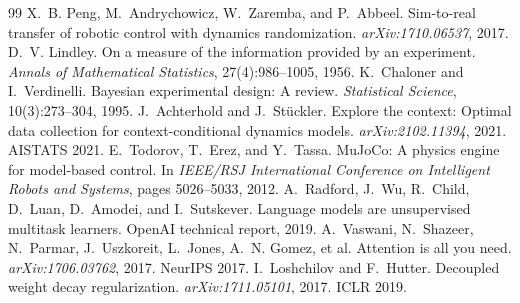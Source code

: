 \documentclass{article}
\begin{document}
\begin{thebibliography}{99}
 X.~B. Peng, M.~Andrychowicz, W.~Zaremba, and P.~Abbeel. Sim-to-real transfer of robotic control with dynamics randomization. \emph{arXiv:1710.06537}, 2017.
 D.~V. Lindley. On a measure of the information provided by an experiment. \emph{Annals of Mathematical Statistics}, 27(4):986--1005, 1956.
 K.~Chaloner and I.~Verdinelli. Bayesian experimental design: A review. \emph{Statistical Science}, 10(3):273--304, 1995.
 J.~Achterhold and J.~St\"uckler. Explore the context: Optimal data collection for context-conditional dynamics models. \emph{arXiv:2102.11394}, 2021. AISTATS 2021.
 E.~Todorov, T.~Erez, and Y.~Tassa. MuJoCo: A physics engine for model-based control. In \emph{IEEE/RSJ International Conference on Intelligent Robots and Systems}, pages 5026--5033, 2012.
 A.~Radford, J.~Wu, R.~Child, D.~Luan, D.~Amodei, and I.~Sutskever. Language models are unsupervised multitask learners. OpenAI technical report, 2019.
 A.~Vaswani, N.~Shazeer, N.~Parmar, J.~Uszkoreit, L.~Jones, A.~N. Gomez, et al. Attention is all you need. \emph{arXiv:1706.03762}, 2017. NeurIPS 2017.
 I.~Loshchilov and F.~Hutter. Decoupled weight decay regularization. \emph{arXiv:1711.05101}, 2017. ICLR 2019.
\end{thebibliography}

\clearpage
\appendix
\end{document}
